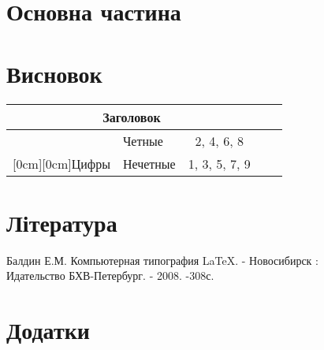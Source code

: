 \documentclass[a4paper]{article}
\begin{document}
\newpage
\section{Основна частина}
\newpage
\section{Висновок}
\begin{center}
\begin{tabularx}{300pt}{|c|X|c|X|c|}
\hline
\multicolumn{3}{|c|}{\textbf{Заголовок}} \\
\hline
& Четные & 2, 4, 6, 8 \\
\cline{2-3}
\raisebox{1.5ex}[0cm][0cm]{Цифры}
& Нечетные & 1, 3, 5, 7, 9 \\
\hline
\end{tabularx}
\end{center}
\newpage
\section{Література}
\begin{thebibliography}{9}
Балдин Е.М. Компьютерная типография LaTeX. - Новосибирск : \\Идательство БХВ-Петербург. - 2008. -308с.
\end{thebibliography}
\newpage
\section{Додатки}
\end{document}

